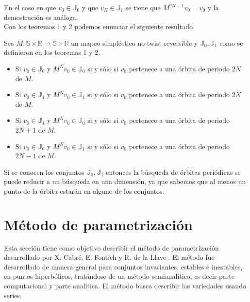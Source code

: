 En el caso en que $v_{0}\in \mathbb{J}_{0}$ y que $v_{N}\in\mathbb{J}_{1}$ se tiene que $M^{2N-1}v_{0}=v_{0}$ y la demostraci\'on es an\'aloga. \\

Con los teoremas 1 y 2 podemos enunciar el siguiente resultado.

\begin{corola}
		Sea $M:\mathbb{S} \times \mathbb{R} \longrightarrow \mathbb{S}\times\mathbb{R}$ un mapeo simpl\'ectico no-twist reversible y $\mathbb{J}_{0}, \mathbb{J}_{1}$ como se definieron en los teoremas 1 y 2. 
		\begin{itemize}
			\item Si $v_{0}\in \mathbb{J}_{0}$ y $M^{N}v_{0}\in \mathbb{J}_{0}$ si y s\'olo si $v_{0}$ pertenece a una \'orbita de periodo $2N$ de $M$.
			\item Si $v_{0}\in \mathbb{J}_{1}$ y $M^{N}v_{0}\in \mathbb{J}_{1}$ si y s\'olo si $v_{0}$ pertenece a una \'orbita de periodo $2N$ de $M$.
			\item Si $v_{0}\in \mathbb{J}_{1}$ y $M^{N}v_{0}\in \mathbb{J}_{0}$ si y s\'olo si $v_{0}$ pertenece a una \'orbita de periodo $2N+1$ de $M$.
			\item Si $v_{0}\in \mathbb{J}_{0}$ y $M^{N}v_{0}\in \mathbb{J}_{1}$ si y s\'olo si $v_{0}$ pertenece a una \'orbita de periodo $2N-1$ de $M$.
		\end{itemize}
\end{corola}
Si se conocen los conjuntos $\mathbb{J}_{0}, \mathbb{J}_{1}$ entonces la b\'usqueda de \'orbitas peri\'odicas se puede reducir a un b\'usqueda en una dimensi\'on, ya que sabemos que al menos un punto de la \'orbita estar\'an en alguno de los conjuntos.









\section{Método de parametrización}
 Esta sección tiene como objetivo describir el método de parametrización desarrollado por X. Cabré, E. Fontich y R. de la Llave \cite{Haro}. El método fue desarrollado de manera general para conjuntos invariantes, estables e inestables, en puntos hiperbólicos, tratándose de un método semianalítico, es decir parte computacional y parte analítica. El m\'etodo busca describir las variedades usando series.\\
	
